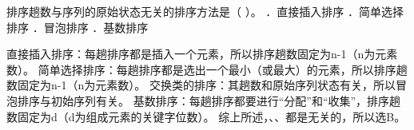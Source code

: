 \question 排序趟数与序列的原始状态无关的排序方法是（ ）。 ．直接插入排序
．简单选择排序 ．冒泡排序 ．基数排序
\par{}
\begin{solution}直接插入排序：每趟排序都是插入一个元素，所以排序趟数固定为n-1（n为元素数）。
简单选择排序：每趟排序都是选出一个最小（或最大）的元素，所以排序趟数固定为n-1（n为元素数）。
交换类的排序：其趟数和原始序列状态有关，所以冒泡排序与初始序列有关。
基数排序：每趟排序都要进行``分配''和``收集''，排序趟数固定为d（d为组成元素的关键字位数）。
综上所述，、、都是无关的，所以选B。
\end{solution}
